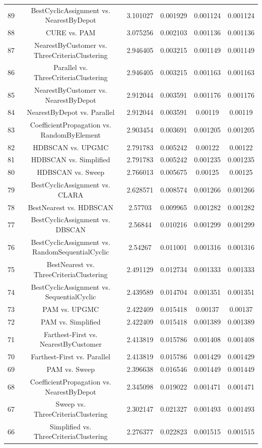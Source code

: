 \documentclass[a4paper,10pt]{article}
\begin{document}
\begin{landscape}
\begin{table}[!htp]
\begin{tabular}{cccccc}
89&BestCyclicAssignment vs. NearestByDepot&3.101027&0.001929&0.001124&0.001124\\
88&CURE vs. PAM&3.075256&0.002103&0.001136&0.001136\\
87&NearestByCustomer vs. ThreeCriteriaClustering&2.946405&0.003215&0.001149&0.001149\\
86&Parallel vs. ThreeCriteriaClustering&2.946405&0.003215&0.001163&0.001163\\
85&NearestByCustomer vs. NearestByDepot&2.912044&0.003591&0.001176&0.001176\\
84&NearestByDepot vs. Parallel&2.912044&0.003591&0.00119&0.00119\\
83&CoefficientPropagation vs. RandomByElement&2.903454&0.003691&0.001205&0.001205\\
82&HDBSCAN vs. UPGMC&2.791783&0.005242&0.00122&0.00122\\
81&HDBSCAN vs. Simplified&2.791783&0.005242&0.001235&0.001235\\
80&HDBSCAN vs. Sweep&2.766013&0.005675&0.00125&0.00125\\
79&BestCyclicAssignment vs. CLARA&2.628571&0.008574&0.001266&0.001266\\
78&BestNearest vs. HDBSCAN&2.57703&0.009965&0.001282&0.001282\\
77&BestCyclicAssignment vs. DBSCAN&2.56844&0.010216&0.001299&0.001299\\
76&BestCyclicAssignment vs. RandomSequentialCyclic&2.54267&0.011001&0.001316&0.001316\\
75&BestNearest vs. ThreeCriteriaClustering&2.491129&0.012734&0.001333&0.001333\\
74&BestCyclicAssignment vs. SequentialCyclic&2.439589&0.014704&0.001351&0.001351\\
73&PAM vs. UPGMC&2.422409&0.015418&0.00137&0.00137\\
72&PAM vs. Simplified&2.422409&0.015418&0.001389&0.001389\\
71&Farthest-First vs. NearestByCustomer&2.413819&0.015786&0.001408&0.001408\\
70&Farthest-First vs. Parallel&2.413819&0.015786&0.001429&0.001429\\
69&PAM vs. Sweep&2.396638&0.016546&0.001449&0.001449\\
68&CoefficientPropagation vs. NearestByDepot&2.345098&0.019022&0.001471&0.001471\\
67&Sweep vs. ThreeCriteriaClustering&2.302147&0.021327&0.001493&0.001493\\
66&Simplified vs. ThreeCriteriaClustering&2.276377&0.022823&0.001515&0.001515\\

\end{tabular}
\end{table}
\end{landscape}
\end{document}
